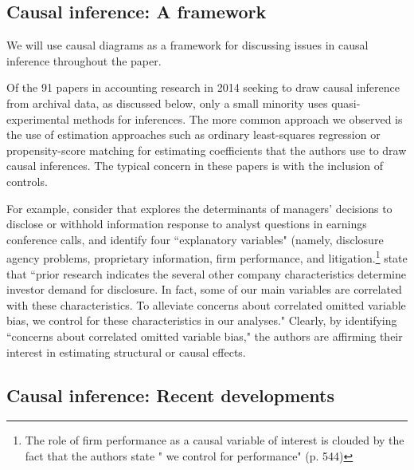 \documentclass[11pt]{amsart}
\begin{document}
\subsection{Causal inference: A framework}
We will use causal diagrams as a framework for discussing issues in causal inference throughout the paper.

Of the 91 papers in accounting research in 2014 seeking to draw causal inference from archival data, as discussed below, only a small minority uses quasi-experimental methods for inferences.
The more common approach we observed is the use of estimation approaches such as ordinary least-squares regression or propensity-score matching for estimating coefficients that the authors use to draw causal inferences.
The typical concern in these papers is with the inclusion of controls.

For example, consider \cite{Hollander:2010jg} that explores the determinants of managers' decisions to disclose or withhold information response to analyst questions in earnings conference calls, and identify four ``explanatory variables" (namely, disclosure agency problems, proprietary information, firm performance, and litigation.\footnote {The role of firm performance as a causal variable of interest is clouded by the fact that the authors state " we control for performance" (p. 544)} \cite{Hollander:2010jg} state that ``prior research indicates the several other company characteristics determine investor demand for disclosure. In fact, some of our main variables are correlated with these characteristics.
To alleviate concerns about correlated omitted variable bias, we control for these characteristics in our analyses."
Clearly, by identifying ``concerns about correlated omitted variable bias," the authors are affirming their interest in estimating structural or causal effects.

\subsection{Causal inference: Recent developments}


\end{document}

